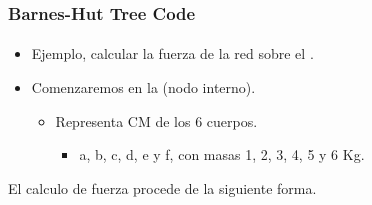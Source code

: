 \frame
{
\frametitle{Barnes-Hut Tree Code}
\framesubtitle{}

\begin{itemize}
	\item Ejemplo, calcular la fuerza de la red sobre el .
	\item Comenzaremos en la  (nodo interno).
	\begin{itemize}
		\item Representa CM de los 6 cuerpos.
		 \begin{itemize}
		 	\item a, b, c, d, e y f, con masas 1, 2, 3, 4, 5 y 6 Kg.
		 \end{itemize}
	\end{itemize}
\end{itemize}
El calculo de fuerza procede de la siguiente forma.
}

